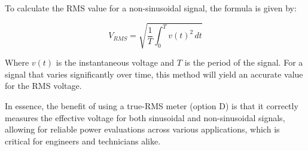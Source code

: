 To calculate the RMS value for a non-sinusoidal signal, the formula is given by:

\[
V_{RMS} = \sqrt{\frac{1}{T} \int_0^T v(t)^2 \, dt}
\]

Where \( v(t) \) is the instantaneous voltage and \( T \) is the period of the signal. For a signal that varies significantly over time, this method will yield an accurate value for the RMS voltage.

In essence, the benefit of using a true-RMS meter (option D) is that it correctly measures the effective voltage for both sinusoidal and non-sinusoidal signals, allowing for reliable power evaluations across various applications, which is critical for engineers and technicians alike. 

